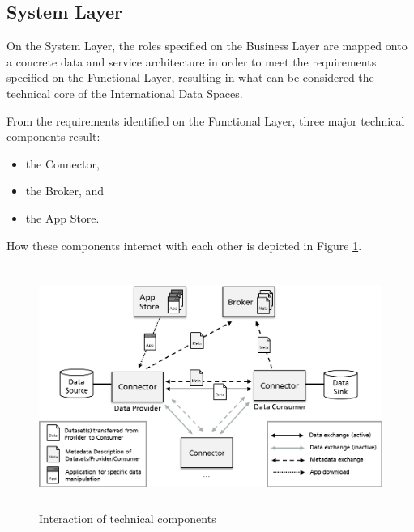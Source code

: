 \subsection{System Layer}
On the System Layer, the roles specified on the Business Layer are mapped onto a concrete data and service architecture in order to meet the requirements specified on the Functional Layer, resulting in what can be considered the technical core of the International Data Spaces.

From the requirements identified on the Functional Layer, three major technical components result:

\begin{itemize}
	\item the Connector,\par

	\item the Broker, and\par

	\item the App Store.
\end{itemize}

How these components interact with each other is depicted in Figure \ref{fig:Interaction_of_technical_components}. 



\begin{figure}[H]
	\begin{Center}
		\includegraphics[width=5.31in,height=3.12in]{./media/image54.png}
		\caption{Interaction of technical components}
		\label{fig:Interaction_of_technical_components}
	\end{Center}
\end{figure}


